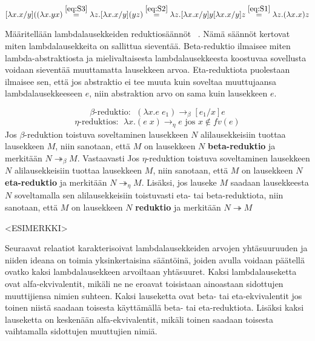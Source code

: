 \[ [\lambda x . x / y]((\lambda x . yx)  \stackrel{\eqref{eq:S3}}{=} \\ 
	\lambda z . [\lambda x . x / y](yz) \stackrel{\eqref{eq:S2}}{=} \\
	\lambda z . [\lambda x . x / y]y [\lambda x . x / y]z \stackrel{\eqref{eq:S1}}{=} \lambda z . (\lambda x . x) z	
\]   

\par

Määritellään lambdalausekkeiden reduktiosäännöt ~\cite[s.~9]{Hudak89}. Nämä säännöt kertovat miten lambdalausekkeita on sallittua sieventää. Beta-reduktio ilmaisee miten lambda-abstraktiosta ja mielivaltaisesta lambdalausekkeesta koostuvaa sovellusta voidaan sieventää muuttamatta lausekkeen arvoa. Eta-reduktiota puolestaan ilmaisee sen, että jos abstraktio ei tee muuta kuin soveltaa muuttujaansa lambdalausekkeeseen $e$, niin abstraktion arvo on sama kuin lausekkeen $e$.     

\begin{maar}[reduktiosäännöt]	
\[\beta \text{-reduktio: } \; (\lambda x.e \; e_{1}) \rightarrow_{\beta} [e_{1} / x]e \]
\[\eta \text{-reduktios: } \; \lambda x.(e \; x) \rightarrow_{\eta} e \text{ jos } x \notin fv(e) \]	
Jos $\beta$-reduktion toistuva soveltaminen lausekkeen $N$ alilausekkeisiin tuottaa lausekkeen $M$, niin sanotaan, että $M$ on lausekkeen $N$ \textbf{beta-reduktio} ja merkitään $N  \twoheadrightarrow_{\beta} M$. Vastaavasti Jos $\eta$-reduktion toistuva soveltaminen lausekkeen $N$ alilausekkeisiin tuottaa lausekkeen $M$, niin sanotaan, että $M$ on lausekkeen $N$ \textbf{eta-reduktio} ja merkitään $N  \twoheadrightarrow_{\eta} M$. Lisäksi, jos lauseke $M$ saadaan lausekkeesta $N$ soveltamalla sen alilausekkeisiin toistuvasti eta- tai beta-reduktiota, niin sanotaan, että $M$ on lausekkeen $N$ \textbf{reduktio} ja merkitään $N  \twoheadrightarrow M$        
\end{maar}

\par

\begin{esim}
<ESIMERKKI>
\end{esim}

\par

Seuraavat relaatiot karakterisoivat lambdalausekkeiden arvojen yhtäsuuruuden ja niiden ideana on toimia yksinkertaisina sääntöinä, joiden avulla voidaan päätellä ovatko kaksi lambdalausekkeen arvoiltaan yhtäsuuret. Kaksi lambdalauseketta ovat alfa-ekvivalentit, mikäli ne ne eroavat toisistaan ainoastaan sidottujen muuttijiensa nimien suhteen. Kaksi lauseketta ovat beta- tai eta-ekvivalentit jos toinen niistä saadaan toisesta käyttämällä beta- tai eta-reduktiota. Lisäksi kaksi lauseketta on keskenään alfa-ekvivalentit, mikäli toinen saadaan toisesta vaihtamalla sidottujen muuttujien nimiä.

